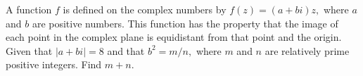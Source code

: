 A function $f$ is defined on the complex numbers by $f(z)=(a+bi)z,$ where $a$ and $b$ are positive numbers.  This function has the property that the image of each point in the complex plane is equidistant from that point and the origin.  Given that $|a+bi|=8$ and that $b^2=m/n,$ where $m$ and $n$ are relatively prime positive integers.  Find $m+n.$